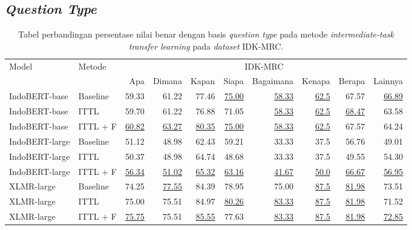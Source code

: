 \subsection{\emph{Question Type}}

\begin{table}[H]\centering
\scriptsize
\begin{tabular}{llrrrrrrrr}
\toprule
         \multirow{2}{*}{Model} &\multirow{2}{*}{Metode} &\multicolumn{8}{c}{IDK-MRC} \\\cmidrule{3-10}
& &Apa &Dimana &Kapan &Siapa &Bagaimana &Kenapa &Berapa &Lainnya \\\midrule
IndoBERT-base &Baseline &59.33 &61.22 &77.46 &\underline{75.00} &\underline{58.33} &\underline{62.5} &67.57 &\underline{66.89} \\
IndoBERT-base &ITTL &59.70 &61.22 &76.88 &71.05 &\underline{58.33} &\underline{62.5} &\underline{68.47} &63.58 \\
IndoBERT-base &ITTL + F &\underline{60.82} &\underline{63.27} &\underline{80.35} &\underline{75.00} &\underline{58.33} &\underline{62.5} &67.57 &64.24 \\
\hline
IndoBERT-large &Baseline &51.12 &48.98 &62.43 &59.21 &33.33 &37.5 &56.76 &49.01 \\
IndoBERT-large &ITTL &50.37 &48.98 &64.74 &48.68 &33.33 &37.5 &49.55 &54.30 \\
IndoBERT-large &ITTL + F &\underline{56.34} &\underline{51.02} &\underline{65.32} &\underline{63.16} &\underline{41.67} &\underline{50.0} &\underline{66.67} &\underline{56.95} \\
\hline
XLMR-large &Baseline &74.25 &\underline{77.55} &84.39 &78.95 &75.00 &\underline{87.5} &\underline{81.98} &73.51 \\
XLMR-large &ITTL &75.00 &75.51 &84.97 &\underline{80.26} &\underline{83.33} &\underline{87.5} &\underline{81.98} &71.52 \\
XLMR-large &ITTL + F &\underline{75.75} &75.51 &\underline{85.55} &77.63 &\underline{83.33} &\underline{87.5} &\underline{81.98} &\underline{72.85} \\
\bottomrule
\end{tabular}
\caption{Tabel perbandingan persentase nilai benar dengan basis \emph{question type} pada metode \emph{intermediate-task transfer learning} pada \emph{dataset} IDK-MRC.}
\end{table}

